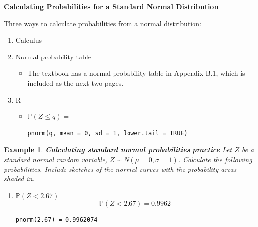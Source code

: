 \documentclass[12pt]{amsart}
\newtheorem{example}[theorem]{Example}
\newcommand{\m}{\mu}
\newcommand{\s}{\sigma}
\newcommand{\bP}{\mathbb{P}}
\begin{document}
{\color{black}



\newpage


\textbf{Calculating Probabilities for a Standard Normal Distribution} \newline

Three ways to calculate probabilities from a normal distribution:

\begin{enumerate}
\item \sout{Calculus}
\item Normal probability table
	\begin{itemize}
	\item The textbook has a normal probability table in Appendix B.1, which is included as the next two pages.
	\end{itemize}
\item R
	\begin{itemize}
	\item $\bP(Z\leq q)$ = \begin{verbatim}pnorm(q, mean = 0, sd = 1, lower.tail = TRUE)\end{verbatim}
	\end{itemize}	
\end{enumerate}

\vspace{.5cm}






\begin{example}  \textbf{Calculating standard normal probabilities practice} \newline
Let $Z$ be a standard normal random variable, $Z\sim N(\m=0,\s=1)$.\newline
Calculate the following probabilities. Include sketches of the normal curves with the probability areas shaded in.

\begin{enumerate}
\item $\bP( Z < 2.67 ) $
\color{blue}
$$\bP( Z < 2.67 )= 0.9962$$
\begin{verbatim}
pnorm(2.67) = 0.9962074                                          
\end{verbatim}
\color{black}


\end{enumerate}
\end{example}}
\end{document}
